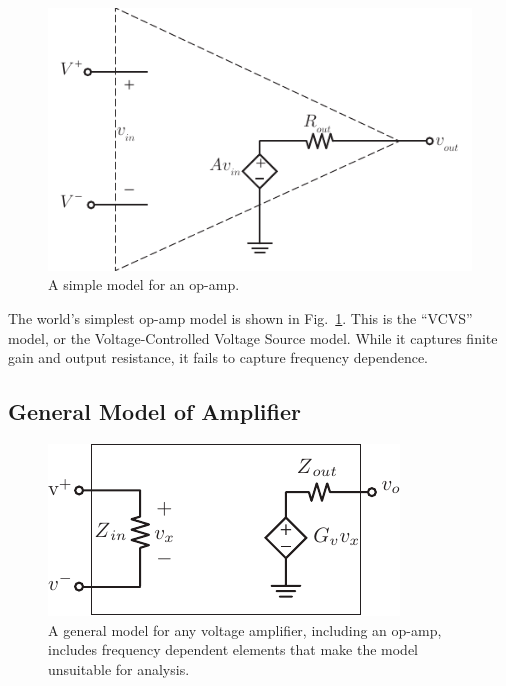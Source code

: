 \begin{figure}[tb]
\begin{center}
\includegraphics[scale=1]{opamp_model}
\end{center}
\caption{A simple model for an op-amp.} \label{fig:opamp_model}
\end{figure}

The world's simplest op-amp model is shown in Fig.~\ref{fig:opamp_model}. This is the ``VCVS'' model, or the Voltage-Controlled Voltage Source model.  While it captures finite gain and output resistance, it fails to capture frequency dependence.
 

\subsection{General Model of Amplifier}

\begin{figure}[tb]
\begin{center}
\includegraphics[scale=1]{vampmodelz}
\end{center}
\caption{A general model for any voltage amplifier, including an op-amp, includes frequency dependent elements that make the model unsuitable for analysis.} \label{fig:vampmodelz}
\end{figure}

